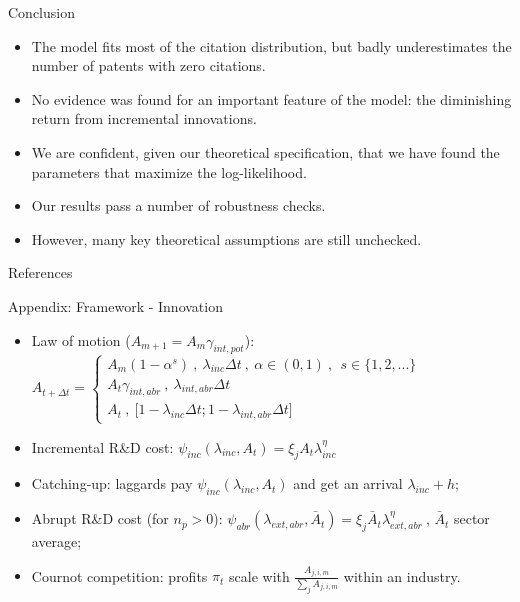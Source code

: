 \documentclass[11pt]{beamer}
\begin{document}
\begin{frame}{Conclusion}
\begin{itemize}\itemsep12pt	
		\item The model fits most of the citation distribution, but badly underestimates the number of  patents with zero citations.
		\item No evidence was found for an important feature of the model: the diminishing return from incremental innovations.
		\item We are confident, given our theoretical specification, that we have found the parameters that maximize the log-likelihood.
		\item Our results pass a number of robustness checks.
		\item However, many key theoretical assumptions are still unchecked.
	\end{itemize}
\end{frame}

\begin{frame}{References}
	\nocite{*}
	
\end{frame}

\begin{frame}{Appendix: Framework - Innovation}
	\begin{itemize}\itemsep10pt	
	\item Law of motion ($A_{m+1} = A_m\gamma_{int, pot}$): $A_{t+\Delta t} =\begin{cases}
               A_m(1-\alpha^{s})\:,\: \lambda_{inc}\Delta t \:,\: \alpha \in (0,1)\:,\:\ s \in \{1, 2, ...\}\\
               A_t\gamma_{int,abr}\:,\: \lambda_{int,abr}\Delta t\\
               A_t \:, \: \big[1 - \lambda_{inc}\Delta t; 1 - \lambda_{int,abr}\Delta t\big] 
    \end{cases}$
	\item Incremental R\&D cost: $\psi_{inc}(\lambda_{inc}, A_{t}) = \xi_j A_t \lambda_{inc}^{\eta}$
	\item Catching-up: laggards pay $\psi_{inc}(\lambda_{inc}, A_{t})$ and get an arrival $\lambda_{inc} + h$;
	\item Abrupt R\&D cost (for $n_p > 0$): $\psi_{abr}(\lambda_{ext,abr}, \bar{A}_{t}) = \xi_j \bar{A}_t \lambda_{ext,abr}^{\eta}\:$, $\bar{A}_{t}$ sector average;
	\item Cournot competition: profits $\pi_t$ scale with $\frac{A_{j,i,m}}{\sum_{j}A_{j,i,m}}$ within an industry.
	\end{itemize}
\end{frame}
\end{document}
